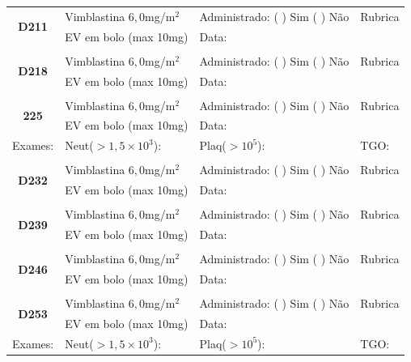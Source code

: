 \documentclass[11pt,a4paper,oldfontcommands]{memoir}
\begin{document}
\begin{center}
\begin{table}[H]
\begin{tabular}{p{}p{}|p{}|p{3cm}}
    \hline
    \multicolumn{1}{c|}{\multirow{2}{*}{\textbf{D211}}}&{Vimblastina \(6,0\)mg/m\(^2\)}&{Administrado: (  ) Sim (  ) Não}&{Rubrica}\\
    \multicolumn{1}{c|}{}&{EV em bolo (max 10mg)}&{Data:}&\\
    \hline
   \\
    \hline
    \multicolumn{1}{c|}{\multirow{2}{*}{\textbf{D218}}}&{Vimblastina \(6,0\)mg/m\(^2\)}&{Administrado: (  ) Sim (  ) Não}&{Rubrica}\\
    \multicolumn{1}{c|}{}&{EV em bolo (max 10mg)}&{Data:}&\\
    \hline
    \\
    \hline
    \multicolumn{1}{c|}{\multirow{2}{*}{\textbf{225}}}&{Vimblastina \(6,0\)mg/m\(^2\)}&{Administrado: (  ) Sim (  ) Não}&{Rubrica}\\
    \multicolumn{1}{c|}{}&{EV em bolo (max 10mg)}&{Data:}&\\
    \hline
    {Exames:}&{Neut(\(>1,5\times10^3\)):}&{Plaq(\(>10^5\)):}&{TGO:}
    \\
    \hline
    \\
    \hline
    \multicolumn{1}{c|}{\multirow{2}{*}{\textbf{D232}}}&{Vimblastina \(6,0\)mg/m\(^2\)}&{Administrado: (  ) Sim (  ) Não}&{Rubrica}\\
    \multicolumn{1}{c|}{}&{EV em bolo (max 10mg)}&{Data:}&\\
    \hline
    \\
    \hline
    \multicolumn{1}{c|}{\multirow{2}{*}{\textbf{D239}}}&{Vimblastina \(6,0\)mg/m\(^2\)}&{Administrado: (  ) Sim (  ) Não}&{Rubrica}\\
    \multicolumn{1}{c|}{}&{EV em bolo (max 10mg)}&{Data:}&\\
    \hline
    \\
    \hline
    \multicolumn{1}{c|}{\multirow{2}{*}{\textbf{D246}}}&{Vimblastina \(6,0\)mg/m\(^2\)}&{Administrado: (  ) Sim (  ) Não}&{Rubrica}\\
    \multicolumn{1}{c|}{}&{EV em bolo (max 10mg)}&{Data:}&\\
    \hline
    \\
        \hline
    \multicolumn{1}{c|}{\multirow{2}{*}{\textbf{D253}}}&{Vimblastina \(6,0\)mg/m\(^2\)}&{Administrado: (  ) Sim (  ) Não}&{Rubrica}\\
    \multicolumn{1}{c|}{}&{EV em bolo (max 10mg)}&{Data:}&\\
    \hline
    {Exames:}&{Neut(\(>1,5\times10^3\)):}&{Plaq(\(>10^5\)):}&{TGO:}
    \\

\end{tabular}
\end{table}
\end{center}
\end{document}
